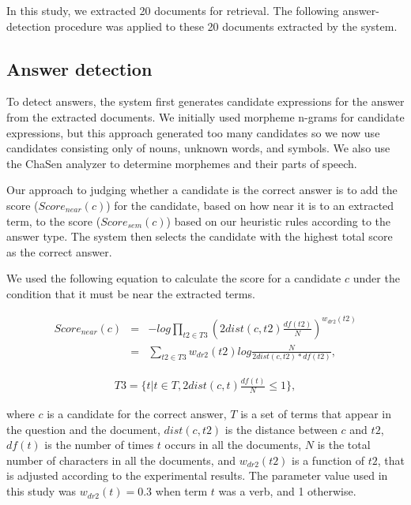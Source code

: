 In this study, we extracted 20 documents for retrieval.  
The following answer-detection procedure was 
applied to these 20 documents extracted by the system. 

\subsection{Answer detection}
\label{sec:detection_of_the_answer}

To detect answers, the system first generates candidate expressions for the answer 
from the extracted documents. We initially used morpheme n-grams for candidate 
expressions, but this approach generated too many candidates so we 
now 
use candidates consisting only of nouns, unknown words, and symbols. We also 
use the ChaSen analyzer to determine morphemes and their parts of speech. 

Our approach to judging whether a candidate is the correct answer is to add the
score ($Score_{near}(c)$) for the candidate, based on how near it is to an extracted term, to 
the score ($Score_{sem}(c)$) based on our heuristic rules according to the answer type. The system then selects the 
candidate with the highest total score as the correct answer. 

We used the following equation to calculate the score for a candidate $c$ 
under the condition that it must be near the extracted terms. 

{
\begin{eqnarray}
  \label{eqn:ir_near_}
Score_{near}(c) & = & \displaystyle - log \prod_{t2 \in T3} 
(2dist(c,t2)\frac{df(t2)}{N})^{w_{dr2}(t2)} \\
& = & \displaystyle \sum_{t2 \in T3} w_{dr2}(t2) log 
\frac{N}{2dist(c,t2)*df(t2)},
\end{eqnarray}}

  {
    \begin{eqnarray}
      \label{eqn:new_test5}
      T3 = \{t| t \in T, 2dist(c,t)\frac{df(t)}{N} \leq 1\},
    \end{eqnarray}}
  
\noindent 
where $c$ is a candidate for the correct answer, $T$ is a set of terms that appear in the question and the document, $dist(c,t2)$ is 
the distance between $c$ and $t2$, $df(t)$ is the number of times $t$ occurs in all the 
documents, $N$ is the total number of characters in all the documents, and 
$w_{dr2}(t2)$ is a function of $t2$, that is adjusted according to the experimental 
results.  The parameter value used in this study was $w_{dr2}(t) = 0.3$ 
when term $t$ was a verb, and 1 otherwise. 

